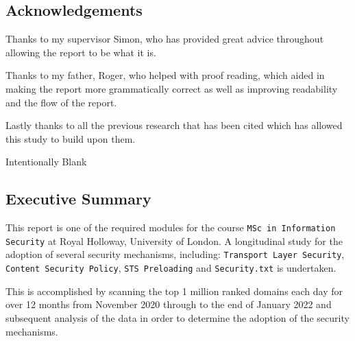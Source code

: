 \documentclass{mscreport}
\begin{document}
\newpage

\begin{center}
\section*{Acknowledgements}
\end{center}

\noindent
Thanks to my supervisor Simon, who has provided great advice throughout allowing the report to be what it is.

\vspace{0.3cm} \noindent
Thanks to my father, Roger, who helped with proof reading, which aided in making the report more grammatically correct as well as improving readability and the flow of the report.

\vspace{0.3cm} \noindent
Lastly thanks to all the previous research that has been cited which has allowed this study to build upon  them.

\newpage

\setcounter{page}{1}
\vspace*{\fill}
\begin{center}
\begin{huge}
Intentionally Blank
\end{huge}
\end{center}
\vspace{\fill}

\newpage

\begin{center}
\section*{Executive Summary}
\end{center}

\noindent
This report is one of the required modules for the course \texttt{MSc in Information Security} at Royal Holloway, University of London. A longitudinal study for the adoption of several security mechanisms, including: \texttt{Transport Layer Security}, \texttt{Content Security Policy}, \texttt{STS Preloading} and \texttt{Security.txt} is undertaken.

\vspace{0.3cm} \noindent
This is accomplished by scanning the top 1 million ranked domains each day for over 12 months from November 2020 through to the end of January 2022 and subsequent analysis of the data in order to determine the adoption of the security mechanisms.
\end{document}
